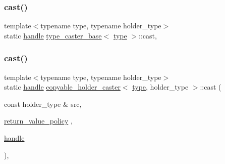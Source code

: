\subsubsection{\texorpdfstring{cast()}{cast()}\hspace{0.1cm}{\footnotesize\ttfamily [3/4]}}
{\footnotesize\ttfamily template$<$typename type, typename holder\+\_\+type$>$ \\
static \mbox{\hyperlink{classhandle}{handle}} \mbox{\hyperlink{classtype__caster__base}{type\+\_\+caster\+\_\+base}}$<$ \mbox{\hyperlink{_s_d_l__opengl_8h_ad5ddf6fca7b585646515660e810e0188}{type}} $>$\+::cast\hspace{0.3cm}{\ttfamily [inline]}, {\ttfamily [static]}}

\mbox{\label{structcopyable__holder__caster_a5b09fa5941d46a4fdedbbb631418a89b}} 
\subsubsection{\texorpdfstring{cast()}{cast()}\hspace{0.1cm}{\footnotesize\ttfamily [4/4]}}
{\footnotesize\ttfamily template$<$typename type, typename holder\+\_\+type$>$ \\
static \mbox{\hyperlink{classhandle}{handle}} \mbox{\hyperlink{structcopyable__holder__caster}{copyable\+\_\+holder\+\_\+caster}}$<$ \mbox{\hyperlink{_s_d_l__opengl_8h_ad5ddf6fca7b585646515660e810e0188}{type}}, holder\+\_\+type $>$\+::cast (\begin{DoxyParamCaption}\item[{const holder\+\_\+type \&}]{src,  }\item[{\mbox{\hyperlink{detail_2common_8h_adde72ab1fb0dd4b48a5232c349a53841}{return\+\_\+value\+\_\+policy}}}]{,  }\item[{\mbox{\hyperlink{classhandle}{handle}}}]{ }\end{DoxyParamCaption})\hspace{0.3cm}{\ttfamily [inline]}, {\ttfamily [static]}}

\mbox{\label{structcopyable__holder__caster_aeaf5f5d682581b26ea69b8ceb0e62951}} 
